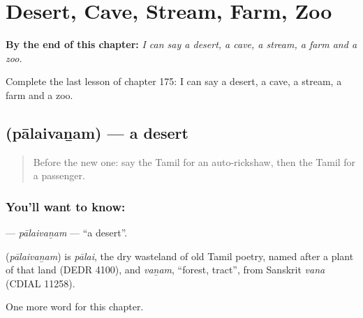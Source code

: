 
\chapter{Desert, Cave, Stream, Farm, Zoo}
\label{ch:ta-desert-cave-stream-farm-zoo}

\begin{chapteropening}
\textbf{By the end of this chapter:} \emph{I can say a desert, a cave, a stream, a farm and a zoo.}

Complete the last lesson of chapter 175: I can say a desert, a cave, a stream, a farm and a zoo.
\end{chapteropening}

\section[\texorpdfstring{\ta{பாலைவனம்} (pālaivaṉam)}{பாலைவனம் (pālaivaṉam)}]{ (pālaivaṉam) — a desert}

\label{lesson:TA-C175-palaivanam}



\begin{quote}
Before the new one: say the Tamil for an auto-rickshaw, then the Tamil for a passenger.
\end{quote}

\subsection*{You'll want to know: }
\textbf{} — \emph{pālaivaṉam} — \textquotedblleft{}a desert\textquotedblright{}.

\begin{cousinweb}
\textbf{} (\emph{pālaivaṉam}) is \emph{pālai}, the dry wasteland of old Tamil poetry, named after a plant of that land (DEDR 4100), and \emph{vaṉam}, \textquotedblleft{}forest, tract\textquotedblright{}, from Sanskrit \emph{vana} (CDIAL 11258).
\end{cousinweb}

\begin{grammarlens}[title={What you've built}]
One more word for this chapter.
\end{grammarlens}

